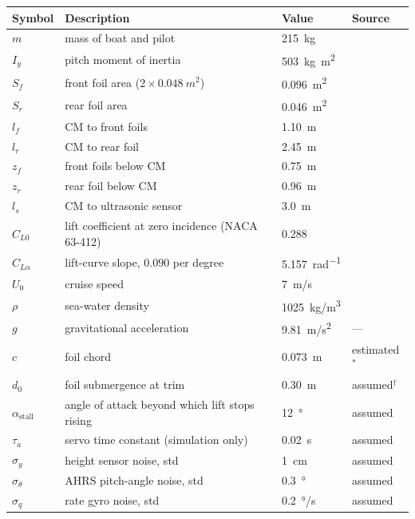 \documentclass[11pt,a4paper]{article}
\begin{document}
\begin{table}[h]
\centering
\begin{tabular}{@{}llll@{}}
\toprule
Symbol & Description & Value & Source \\ \midrule
$m$ & mass of boat and pilot & \SI{215}{kg} & \cite{belime} \\
$I_y$ & pitch moment of inertia & \SI{503}{kg.m^2} & \cite{belime} \\
$S_f$ & front foil area ($2\times\SI{0.048}{m^2}$) & \SI{0.096}{m^2} & \cite{belime} \\
$S_r$ & rear foil area & \SI{0.046}{m^2} & \cite{belime} \\
$l_f$ & CM to front foils & \SI{1.10}{m} & \cite{belime} \\
$l_r$ & CM to rear foil & \SI{2.45}{m} & \cite{belime} \\
$z_f$ & front foils below CM & \SI{0.75}{m} & \cite{belime} \\
$z_r$ & rear foil below CM & \SI{0.96}{m} & \cite{belime} \\
$l_s$ & CM to ultrasonic sensor & \SI{3.0}{m} & \cite{belime} \\
$C_{L0}$ & lift coefficient at zero incidence (NACA 63-412) & 0.288 & \cite{belime} \\
$C_{L\alpha}$ & lift-curve slope, $0.090$ per degree & \SI{5.157}{rad^{-1}} & \cite{belime} \\
$U_0$ & cruise speed & \SI{7}{m/s} & \cite{belime} \\
$\rho$ & sea-water density & \SI{1025}{kg/m^3} & \cite{belime} \\
$g$ & gravitational acceleration & \SI{9.81}{m/s^2} & --- \\
$c$ & foil chord & \SI{0.073}{m} & estimated$^{\ast}$ \\
$d_0$ & foil submergence at trim & \SI{0.30}{m} & assumed$^{\dagger}$ \\
$\alpha_{\mathrm{stall}}$ & angle of attack beyond which lift stops rising & \SI{12}{\degree} & assumed \\
$\tau_a$ & servo time constant (simulation only) & \SI{0.02}{s} & assumed \\
$\sigma_y$ & height sensor noise, std & \SI{1}{cm} & assumed \\
$\sigma_\theta$ & AHRS pitch-angle noise, std & \SI{0.3}{\degree} & assumed \\
$\sigma_q$ & rate gyro noise, std & \SI{0.2}{\degree/s} & assumed \\
\bottomrule
\end{tabular}
\end{table}
\end{document}
